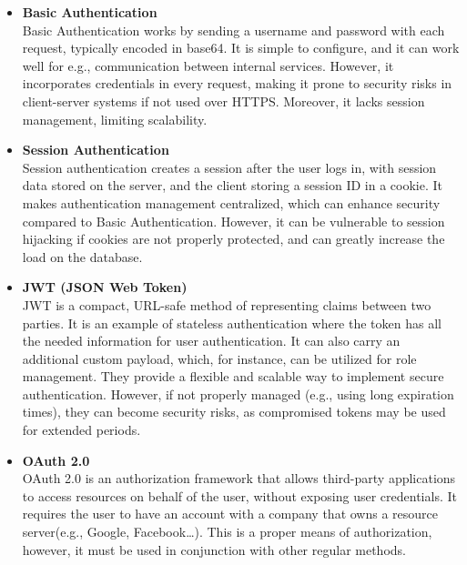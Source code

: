 \begin{itemize}
    \item \textbf{Basic Authentication} \\
    Basic Authentication works by sending a username and password with each request,
    typically encoded in base64.\cite{basic_auth} It is simple to configure, and it can work well for e.g., communication between internal services. However, it incorporates credentials in every request,
    making it prone to security risks in client-server systems if not used over HTTPS.
    Moreover, it lacks session management, limiting scalability.

    \item \textbf{Session Authentication} \\
    Session authentication creates a session after the user logs in, with session
    data stored on the server, and the client storing a session ID in a cookie.
    It makes authentication management centralized, which can enhance security compared to Basic Authentication.
    However, it can be vulnerable to session hijacking if cookies are not properly protected, and can greatly increase the load on the database.\cite{session_auth}

    \item \textbf{JWT (JSON Web Token)} \\
    JWT is a compact, URL-safe method of representing claims between two parties.\cite{jwt}
    It is an example of stateless authentication where the token has all the needed information for user authentication.
    It can also carry an additional custom payload, which, for instance, can be utilized for role management.
    They provide a flexible and scalable way to implement secure authentication.
    However, if not properly managed (e.g., using long expiration times), they can become security risks,
    as compromised tokens may be used for extended periods.

    \item \textbf{OAuth 2.0} \\
    OAuth 2.0 is an authorization framework that allows third-party applications to access resources
    on behalf of the user, without exposing user credentials.\cite{oauth2} It requires the user to have an account
    with a company that owns a resource server(e.g., Google, Facebook\ldots). This is a proper means of
    authorization, however, it must be used in conjunction with other regular methods.
\end{itemize}


